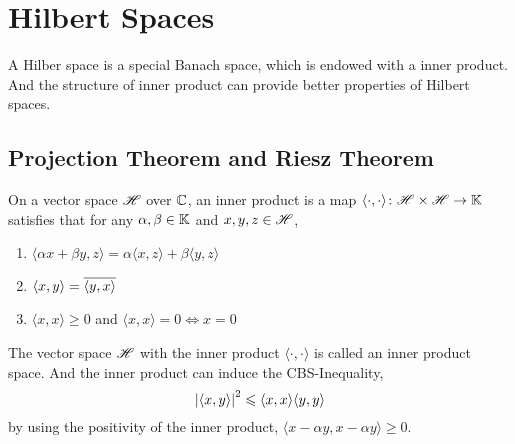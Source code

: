 \documentclass[a4paper,11pt]{report}
\begin{document}

\section{Hilbert Spaces}

A Hilber space is a special Banach space, which is endowed with a inner product. And the structure of inner product can provide better properties of Hilbert spaces.

\subsection{Projection Theorem and Riesz Theorem}

\begin{defn}
	On a vector space $\mathscr{H}$ over $\mathbb{C}$, an inner product is a map $ \langle \cdot, \cdot \rangle \colon \mathscr{H} \times \mathscr{H} \rightarrow \mathbb{K}$ satisfies that for any $\alpha, \beta \in \mathbb{K}$ and $x,y,z \in \mathscr{H}$,
	\begin{enumerate}[label=\arabic*)]
	 	\item $ \langle \alpha x + \beta y,z \rangle = \alpha  \langle x,z \rangle + \beta  \langle y,z \rangle$
	 	\item $ \langle x,y \rangle = \overline{ \langle y,x \rangle}$
	 	\item $ \langle x,x \rangle \geqslant 0$ and $ \langle x,x \rangle = 0 \Leftrightarrow x = 0$
	\end{enumerate} 
\end{defn}
\begin{rem}
	The vector space $\mathscr{H}$ with the inner product $ \langle \cdot,\cdot \rangle$ is called an inner product space. And the inner product can induce the CBS-Inequality, 
	\begin{equation*}
		\left\lvert \langle x,y \rangle\right\lvert^{2} \leqslant  \langle x,x \rangle \langle y,y \rangle
	\end{equation*}
	by using the positivity of the inner product, $ \langle x-\alpha y,x-\alpha y \rangle \geqslant$0.
\end{rem}
\end{document}
